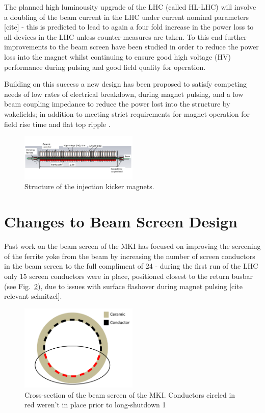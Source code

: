 \documentclass[a4paper,
              ]{jacow}
\begin{document}
The planned high luminousity upgrade of the LHC (called HL-LHC) will involve a doubling of the beam current in the LHC under current nominal parameters [cite] - this is predicted to lead to again a four fold increase in the power loss to all devices in the LHC unless counter-measures are taken. To this end further improvements to the beam screen have been studied in order to reduce the power loss into the magnet whilst continuing to ensure good high voltage (HV) performance during pulsing and good field quality for operation.

Building on this success a new design has been proposed to satisfy competing needs of low rates of electrical breakdown, during magnet pulsing, and a low beam coupling impedance to reduce the power lost into the structure by wakefields; in addition to meeting strict requirements for magnet operation for field rise time and flat top ripple \cite{mkiUpgrade}. 

\begin{figure}
\includegraphics[width=0.5\textwidth]{MKICrossSectionYZ.pdf}
\caption{Structure of the injection kicker magnets.}
\label{fig:mkiStruct}
\end{figure}

\section{Changes to Beam Screen Design}

Past work on the beam screen of the MKI has focused on improving the screening of the ferrite yoke from the beam by increasing the number of screen conductors in the beam screen to the full compliment of 24 - during the first run of the LHC only 15 screen conductors were in place, positioned closest to the return busbar (see Fig.~\ref{fig:LengthWiseSlice}), due to issues with surface flashover during magnet pulsing [cite relevant schnitzel]. 

\begin{figure}
\begin{center}
\includegraphics[width=0.5\textwidth]{sliceLabelled.pdf}
\caption{Cross-section of the beam screen of the MKI. Conductors circled in red weren't in place prior to long-shutdown 1}
\label{fig:LengthWiseSlice}
\end{center}
\end{figure}
\end{document}

